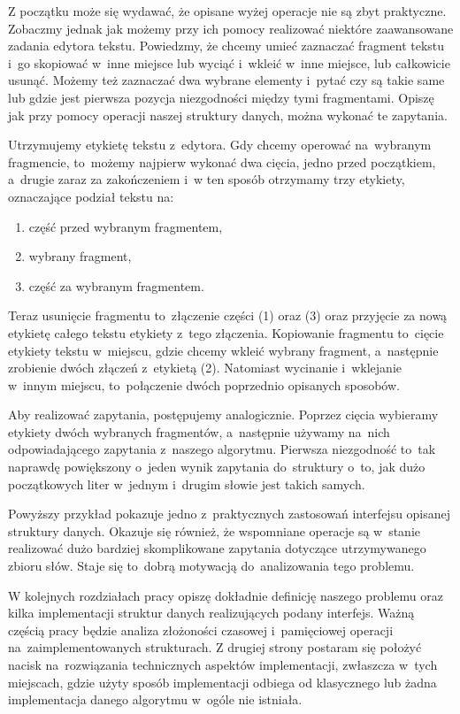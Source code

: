 \documentclass[declaration,shortabstract]{iithesis}
\theoremstyle{definition} \newtheorem{definition}{Definicja}[chapter]
\theoremstyle{plain} \newtheorem{remark}[definition]{Obserwacja}
\theoremstyle{plain} \newtheorem{theorem}[definition]{Twierdzenie}
\theoremstyle{plain} \newtheorem{example}{Przykład}[definition]
\theoremstyle{plain} \newtheorem{lemma}[definition]{Lemat}
\begin{document}
Z początku może się wydawać, że opisane wyżej operacje nie są zbyt praktyczne. Zobaczmy jednak jak możemy przy ich pomocy realizować niektóre zaawansowane zadania edytora tekstu. Powiedzmy, że chcemy umieć zaznaczać fragment tekstu i~go skopiować w~inne miejsce lub wyciąć i~wkleić w~inne miejsce, lub całkowicie usunąć. Możemy też zaznaczać dwa wybrane elementy i~pytać czy są takie same lub gdzie jest pierwsza pozycja niezgodności między tymi fragmentami. Opiszę jak przy pomocy operacji naszej struktury danych, można wykonać te zapytania.

Utrzymujemy etykietę tekstu z~edytora. Gdy chcemy operować na~wybranym fragmencie, to~możemy najpierw wykonać dwa cięcia, jedno przed początkiem, a~drugie zaraz za zakończeniem i~w ten sposób otrzymamy trzy etykiety, oznaczające podział tekstu na:
\begin{enumerate}
    \item część przed wybranym fragmentem,
    \item wybrany fragment,
    \item część za wybranym fragmentem.
\end{enumerate}
Teraz usunięcie fragmentu to~złączenie części (1) oraz (3) oraz przyjęcie za nową etykietę całego tekstu etykiety z~tego złączenia. Kopiowanie fragmentu to~cięcie etykiety tekstu w~miejscu, gdzie chcemy wkleić wybrany fragment, a~następnie zrobienie dwóch złączeń z~etykietą (2). Natomiast wycinanie i~wklejanie w~innym miejscu, to~połączenie dwóch poprzednio opisanych sposobów.

Aby realizować zapytania, postępujemy analogicznie. Poprzez cięcia wybieramy etykiety dwóch wybranych fragmentów, a~następnie używamy na~nich odpowiadającego zapytania z~naszego algorytmu. Pierwsza niezgodność to~tak naprawdę powiększony o~jeden wynik zapytania do~struktury o~to, jak dużo początkowych liter w~jednym i~drugim słowie jest takich samych.

Powyższy przykład pokazuje jedno z~praktycznych zastosowań interfejsu opisanej struktury danych. Okazuje się również, że wspomniane operacje są w~stanie realizować dużo bardziej skomplikowane zapytania dotyczące utrzymywanego zbioru słów. Staje się to~dobrą motywacją do~analizowania tego problemu. 

W kolejnych rozdziałach pracy opiszę dokładnie definicję naszego problemu oraz kilka implementacji struktur danych realizujących podany interfejs. Ważną częścią pracy będzie analiza złożoności czasowej i~pamięciowej operacji na~zaimplementowanych strukturach. Z drugiej strony postaram się położyć nacisk na~rozwiązania technicznych aspektów implementacji, zwłaszcza w~tych miejscach, gdzie użyty sposób implementacji odbiega od klasycznego lub żadna implementacja danego algorytmu w~ogóle nie istniała.
\end{document}
